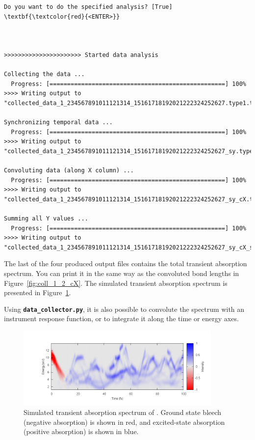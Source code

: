 \documentclass[a4paper,11pt,DIV=15,openany]{scrbook}
\newcommand{\ttt}[1]{\textbf{\texttt{#1}}}
\begin{document}
\begin{oframed}
\begin{Verbatim}[commandchars=\\\{\}]
Do you want to do the specified analysis? [True] \textbf{\textcolor{red}{<ENTER>}}



>>>>>>>>>>>>>>>>>>>>>> Started data analysis

Collecting the data ...
  Progress: [==================================================] 100%
>>>> Writing output to "collected_data_1_234567891011121314_15161718192021222324252627.type1.txt"...

Synchronizing temporal data ...
  Progress: [==================================================] 100%
>>>> Writing output to "collected_data_1_234567891011121314_15161718192021222324252627_sy.type2.txt"...

Convoluting data (along X column) ...
  Progress: [==================================================] 100%
>>>> Writing output to "collected_data_1_234567891011121314_15161718192021222324252627_sy_cX.type3.txt"...

Summing all Y values ...
  Progress: [==================================================] 100%
>>>> Writing output to "collected_data_1_234567891011121314_15161718192021222324252627_sy_cX_sY.type3.txt"...

\end{Verbatim}
\end{oframed}

\normalsize
The last of the four produced output files contains the total transient absorption spectrum.
You can print it in the same way as the convoluted bond lengths in Figure~\ref{fig:coll_1_2_cX}.
The simulated transient absorption spectrum is presented in Figure~\ref{fig:TAS}.

Using \ttt{data\_collector.py}, it is also possible to convolute the spectrum with an instrument response function, or to integrate it along the time or energy axes.

\begin{figure}[h]
  \centering
  \includegraphics[width=0.9\textwidth]{figures/TAS.png}
  \caption{Simulated transient absorption spectrum of . Ground state bleech (negative absorption) is shown in red, and excited-state absorption (positive absorption) is shown in blue.}
  \label{fig:TAS}
\end{figure}
\end{document}
